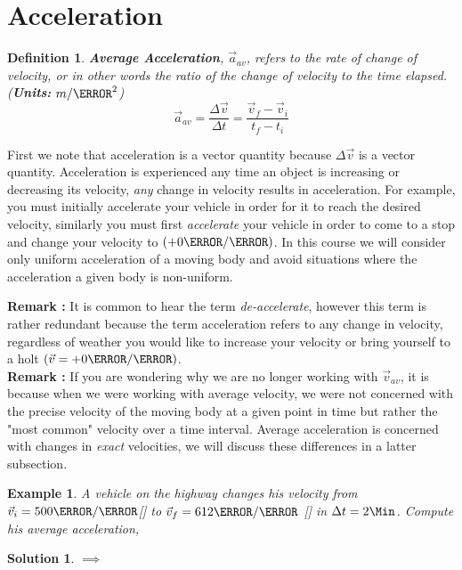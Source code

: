 \documentclass[12pt]{article}
\newcommand{\tx}[1]{\text{#1}}
\theoremstyle{break}
\newtheorem{ex}[thm]{Example}
\newtheorem*{soln}{Solution}
\newtheorem{defn}{Definition}[subsection]
\begin{document}
\let\ref\Cref
\section{Acceleration}
\begin{defn}
\textbf{Average Acceleration}, $\vec a_{av}$, refers to the rate of change of velocity, or in other words the ratio of the change of velocity to the time elapsed. (\textbf{Units:} $m / \s^2$)
$$\vec a_{av} = \frac{\Delta \vec v}{\Delta t} = \frac{\vec v_f - \vec v_i}{t_f - t_i}$$
\end{defn}
First we note that acceleration is a vector quantity because $\Delta \vec v$ is a vector quantity. Acceleration is experienced any time an object is increasing or decreasing its velocity, \emph{any} change in velocity results in acceleration. For example, you must initially accelerate your vehicle in order for it to reach the desired velocity, similarly you must first \emph{accelerate} your vehicle in order to come to a stop and change your velocity to $(+0\m / \s)$. In this course we will consider only uniform acceleration of a moving body and avoid situations where the acceleration a given body is non-uniform.

\textbf{Remark :} It is common to hear the term \emph{de-accelerate}, however this term is rather redundant because the term acceleration refers to any change in velocity, regardless of weather you would like to increase your velocity or bring yourself to a holt $(\vec v = +0\m / \s)$. \\

\textbf{Remark :} If you are wondering why we are no longer working with $\vec v_{av}$, it is because when we were working with average velocity, we were not concerned with the precise velocity of the moving body at a given point in time but rather the "most common" velocity over a time interval. Average acceleration is concerned with changes in \emph{exact} velocities, we will discuss these differences in a latter subsection.

\begin{ex}
A vehicle on the highway changes his velocity from $\vec v_i = 500 \m / \s $[\tx{East}] to $\vec v_f = 612 \m / \s$ [\tx{West}] in $\Delta t = 2\Min$. Compute his average acceleration,
\end{ex}
\begin{soln}
	$\implies$
\vspace*{4cm}
\end{soln}
\end{document}

